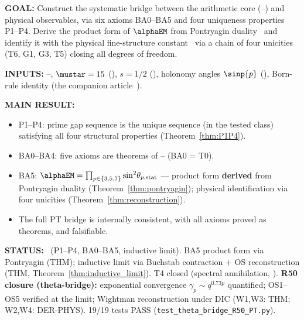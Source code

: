 \documentclass[12pt,a4paper]{article}
\begin{document}
\begin{statusbox}
\textbf{GOAL:}
  Construct the systematic bridge between the arithmetic core
  (\cite{companion_M1}--\cite{companion_M3}) and physical observables, via six axioms BA0--BA5
  and four uniqueness properties P1--P4. Derive the product form
  of $\alphaEM$ from Pontryagin duality~\cite{Pontryagin1966,Rudin1962}
  and identify it with the physical fine-structure
  constant~\cite{CODATA2018} via
  a chain of four unicities (T6, G1, G3, T5) closing all degrees of freedom.

\textbf{INPUTS:}
  \cite{companion_M1}--\cite{companion_M2}, $\mustar = 15$ (\cite{companion_M3}), $s = 1/2$
  (\cite{companion_M1}), holonomy angles $\sinp{p}$ (\cite{companion_M2}), Born-rule identity
  (the companion article~\cite{companion_physics}).

\textbf{MAIN RESULT:}
  \begin{itemize}[nosep]
  \item P1--P4: prime gap sequence is the unique sequence (in the
    tested class) satisfying all four structural properties
    (Theorem~\ref{thm:P1P4}).
  \item BA0--BA4: five axioms are theorems of
    \cite{companion_M1}--\cite{companion_M3} (BA0 = T0).
  \item BA5: $\alphaEM = \prod_{p \in \{3,5,7\}} \sin^2\!\theta_{p,\rm stat}$
    --- product form \textbf{derived} from Pontryagin duality
    (Theorem~\ref{thm:pontryagin}); physical identification via
    four unicities (Theorem~\ref{thm:reconstruction}).
  \item The full PT bridge is internally consistent, with all axioms
    proved as theorems, and falsifiable.
  \end{itemize}

\textbf{STATUS:}
  \THMTAG~(P1--P4, BA0--BA5, inductive limit).
  BA5 product form via Pontryagin (THM);
  inductive limit via Buchstab contraction + OS reconstruction
  (THM, Theorem~\ref{thm:inductive_limit}).
  T4 closed (spectral annihilation, \cite{companion_M3}).
  \textbf{R50 closure (theta-bridge):} exponential convergence
  $\gamma_p \sim q^{0.73p}$ quantified; OS1--OS5 verified at the limit;
  Wightman reconstruction under DIC (W1,W3: THM; W2,W4: DER-PHYS).
  19/19 tests PASS (\texttt{test\_theta\_bridge\_R50\_PT.py}).


\end{statusbox}
\end{document}
